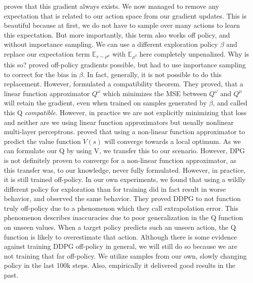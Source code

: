 \documentclass[hyperref,final,beleg]{cgvpub}
\begin{document}
\cite[Theorem 1]{silverDeterministicPolicyGradient2013} proves that this gradient always exists. We now managed to remove any expectation that is related to our action space from our gradient updates. This is beautiful because at first, we do not have to sample over many actions to learn this expectation. But more importantly, this term also works off policy, and without importance sampling. We can use a different exploration policy $\beta$ and replace our expectation term $\mathbb{E}_{s \sim \rho^{\mu}}$ with $\mathbb{E}_{\rho^{\beta}}$ here completely unpenalized. Why is this so? \cite{degrisOffPolicyActorCritic2013} proved off-policy gradients possible, but had to use importance sampling to correct for the bias in $\beta$. In fact, generally, it is not possible to do this replacement. However, \cite[Section 4.3]{silverDeterministicPolicyGradient2013} formulated a compatibility theorem. They proved, that a linear function approximator $Q^{\omega}$ which minimizes the MSE between $Q^{\omega}$ and $Q^{\mu}$ will retain the gradient, even when trained on samples generated by $\beta$, and called this Q \textit{compatible}. However, in practice we are not explicitly minimizing that loss and neither are we using linear function approximators but usually nonlinear multi-layer perceptrons. \cite{bhatnagarConvergentTemporalDifferenceLearning2009} proved that using a non-linear function approximator to predict the value function $V(s)$ will converge towards a local optimum. As we can formulate our Q by using V, we transfer this to our scenario. However, \ac{DPG} is not definitely proven to converge for a non-linear function approximator, as this transfer was, to our knowledge, never fully formulated. However, in practice, it is still trained off-policy. In our own experiments, we found that using a wildly different policy for exploration than for training did in fact result in worse behavior, and \cite{fujimotoOffPolicyDeepReinforcement2019} observed the same behavior. They proved DDPG to not function truly off-policy due to a phenomenon which they call extrapolation error. This phenomenon describes inaccuracies due to poor generalization in the Q function on unseen values. When a target policy predicts such an unseen action, the Q function is likely to overestimate that action. Although there is some evidence against training \ac{DDPG} off-policy in general, we will still do so because we are not training that far off-policy. We utilize samples from our own, slowly changing policy in the last 100k steps. Also, empirically it delivered good results in the past.
\end{document}
